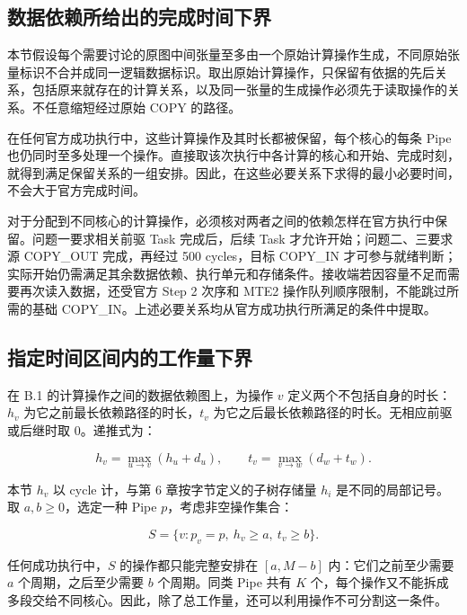 \documentclass[anonymous,withtoc]{gmcm2026}
\begin{document}
\subsection{数据依赖所给出的完成时间下界}

本节假设每个需要讨论的原图中间张量至多由一个原始计算操作生成，不同原始张量标识不合并成同一逻辑数据标识。取出原始计算操作，只保留有依据的先后关系，包括原来就存在的计算关系，以及同一张量的生成操作必须先于读取操作的关系。不任意缩短经过原始 COPY 的路径。

在任何官方成功执行中，这些计算操作及其时长都被保留，每个核心的每条 Pipe 也仍同时至多处理一个操作。直接取该次执行中各计算的核心和开始、完成时刻，就得到满足保留关系的一组安排。因此，在这些必要关系下求得的最小必要时间，不会大于官方完成时间。

对于分配到不同核心的计算操作，必须核对两者之间的依赖怎样在官方执行中保留。问题一要求相关前驱 Task 完成后，后续 Task 才允许开始；问题二、三要求源 COPY\_OUT 完成，再经过 500 cycles，目标 COPY\_IN 才可参与就绪判断；实际开始仍需满足其余数据依赖、执行单元和存储条件。接收端若因容量不足而需要再次读入数据，还受官方 Step 2 次序和 MTE2 操作队列顺序限制，不能跳过所需的基础 COPY\_IN。上述必要关系均从官方成功执行所满足的条件中提取。

\subsection{指定时间区间内的工作量下界}

在 B.1 的计算操作之间的数据依赖图上，为操作 \(v\) 定义两个不包括自身的时长：\(h_v\) 为它之前最长依赖路径的时长，\(t_v\) 为它之后最长依赖路径的时长。无相应前驱或后继时取 0。递推式为：

\begin{equation}
h_v = \max_{u \to v}(h_u + d_u), \qquad t_v = \max_{v \to w}(d_w + t_w).
\end{equation}

本节 \(h_v\) 以 cycle 计，与第 6 章按字节定义的子树存储量 \(h_i\) 是不同的局部记号。取 \(a, b \ge 0\)，选定一种 Pipe \(p\)，考虑非空操作集合：

\begin{equation}
S = \{v: p_v = p, \ h_v \ge a, \ t_v \ge b\}.
\end{equation}

任何成功执行中，\(S\) 的操作都只能完整安排在 \([a, M - b]\) 内：它们之前至少需要 \(a\) 个周期，之后至少需要 \(b\) 个周期。同类 Pipe 共有 \(K\) 个，每个操作又不能拆成多段交给不同核心。因此，除了总工作量，还可以利用操作不可分割这一条件。
\end{document}

